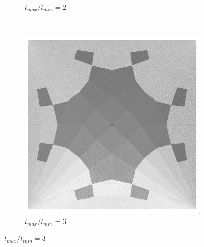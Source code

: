 \begin{figure}[H]
\begin{subfigure}[b]{.32\textwidth}
  \caption{$t_{max}/t_{min}=2$}
\end{subfigure}
~
\begin{subfigure}[b]{.32\textwidth}
  \centering
  \includegraphics[width=.99\linewidth]{images/t_opt_l2d10_gamma3}
  \caption{$t_{max}/t_{min}=3$}
\end{subfigure}


\end{figure}

